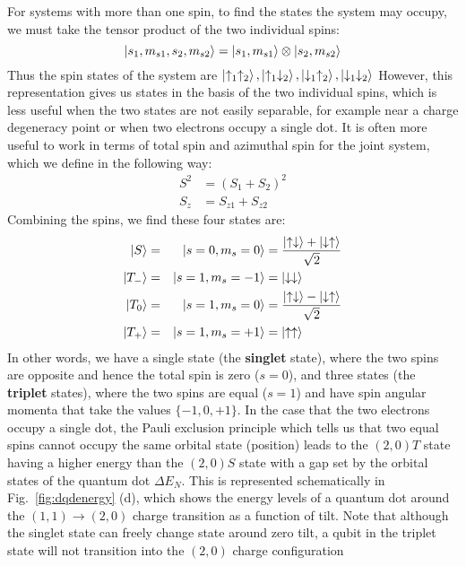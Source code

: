 For systems with more than one spin, to find the states the system may occupy, we must take the
tensor product of the two individual spins:
\begin{equation}
  \ket{s_1, m_{s1}, s_2, m_{s2}} = \ket{s_1, m_{s1}} \otimes \ket{s_2, m_{s2}}
\end{equation}
Thus the spin states of the system are $\ket{\uparrow_1\uparrow_2}, \ket{\uparrow_1\downarrow_2}, \ket{\downarrow_1\uparrow_2}, \ket{\downarrow_1\downarrow_2}$
However, this representation gives us states in the basis of the two individual spins, which is less useful
when the two states are not easily separable, for example near a charge degeneracy point or when two electrons occupy a single dot.
It is often more useful to work in terms of total spin and azimuthal spin for the joint system, which we define in the following way:
\begin{eqnarray}
  S^2 &= (S_1 + S_2)^2 \\
  S_z &= S_{z1} + S_{z2}
\end{eqnarray}
Combining the spins, we find these four states are:
\begin{alignat}{2}
  \ket{S}   &= &\ket{s = 0, m_s = 0}   &= \frac{\ket{\uparrow\downarrow} + \ket{\downarrow\uparrow}}{\sqrt{2}} \\
  \ket{T_-} &= &\ket{s = 1, m_s = -1}  &= \ket{\downarrow\downarrow} \\
  \ket{T_0} &= &\ket{s = 1, m_s = 0}   &= \frac{\ket{\uparrow\downarrow} - \ket{\downarrow\uparrow}}{\sqrt{2}} \\
  \ket{T_+} &= &\ket{s = 1, m_s = +1}  &= \ket{\uparrow\uparrow}
\end{alignat}
In other words, we have a single state (the \textbf{singlet} state), where the two spins are opposite and hence
the total spin is zero ($s = 0$), and three states (the \textbf{triplet} states), where the two spins are equal ($s = 1$) and have
spin angular momenta that take the values $\{-1, 0, +1\}$. In the case that the two electrons occupy a single dot, the Pauli exclusion principle which tells
us that two equal spins cannot occupy the same orbital state (position) leads to the $(2, 0)T$ state having a higher
energy than the $(2, 0)S$ state with a gap set by the orbital states of the quantum dot $\Delta E_N$. This is
represented schematically in Fig.~\ref{fig:dqdenergy} (d), which shows the energy levels of a quantum dot around the
$(1, 1) \rightarrow (2, 0)$ charge transition as a function of tilt. Note that although the singlet state can freely
change state around zero tilt, a qubit in the triplet state will not transition into the $(2, 0)$ charge configuration
